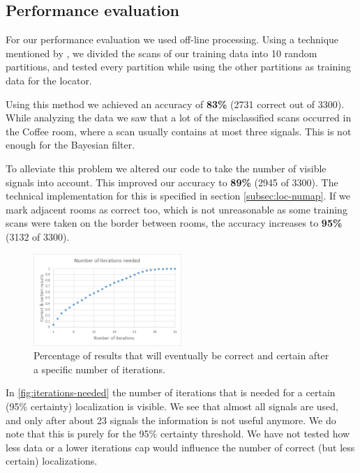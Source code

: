 \documentclass[a4paper,10pt,twoside]{IEEEtran}
\begin{document}
\subsection{Performance evaluation}
\label{sec:loc-evaluation}

For our performance evaluation we used off-line processing. Using a technique mentioned by \cite{mit1}, we divided the scans of our training data into 10 random partitions, and tested every partition while using the other partitions as training data for the locator.

Using this method we achieved an accuracy of \textbf{83\%} (2731 correct out of 3300).
While analyzing the data we saw that a lot of the misclassified scans occurred in the Coffee room,
where a scan usually contains at most three signals. This is not enough for the Bayesian filter.

To alleviate this problem we altered our code to take the number of visible signals into account.
This improved our accuracy to \textbf{89\%} (2945 of 3300).
The technical implementation for this is specified in section \ref{subsec:loc-numap}.
If we mark adjacent rooms as correct too, which is not unreasonable as some training scans were taken on the border between rooms, the accuracy increases to \textbf{95\%} (3132 of 3300).

\begin{figure}
  \centering
    \includegraphics[width=0.5\textwidth]{iterations_needed}
    \caption{Percentage of results that will eventually be correct and certain after a specific number of iterations.}
    \label{fig:iterations-needed}
\end{figure}

In \autoref{fig:iterations-needed} the number of iterations that is needed for a certain (95\% certainty) localization is visible.
We see that almost all signals are used, and only after about 23 signals the information is not useful anymore.
We do note that this is purely for the 95\% certainty threshold.
We have not tested how less data or a lower iterations cap would influence the number of correct (but less certain) localizations.
\end{document}
